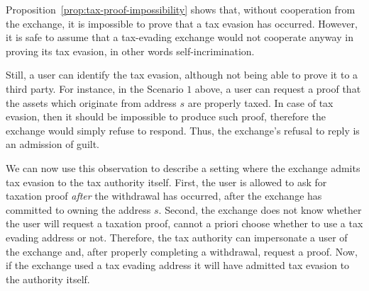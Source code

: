 Proposition~\ref{prop:tax-proof-impossibility} shows that, without cooperation
from the exchange, it is impossible to prove that a tax evasion has occurred.
However, it is safe to assume that a tax-evading exchange would not cooperate
anyway in proving its tax evasion, in other words self-incrimination.

Still, a user can identify the tax evasion, although not being able to prove it
to a third party. For instance, in the Scenario $1$ above, a user can request a
proof that the assets which originate from address $s$ are properly taxed. In
case of tax evasion, then it should be impossible to produce such proof,
therefore the exchange would simply refuse to respond. Thus, the exchange's
refusal to reply is an admission of guilt.

We can now use this observation to describe a setting where the exchange admits
tax evasion to the tax authority itself. First, the user is allowed to ask for
taxation proof \emph{after} the withdrawal has occurred, \ie after the exchange
has committed to owning the address $s$. Second, the exchange does not know
whether the user will request a taxation proof, \ie cannot a priori choose
whether to use a tax evading address or not. Therefore, the tax authority can
impersonate a user of the exchange and, after properly completing a withdrawal,
request a proof. Now, if the exchange used a tax evading address it will have
admitted tax evasion to the authority itself.
